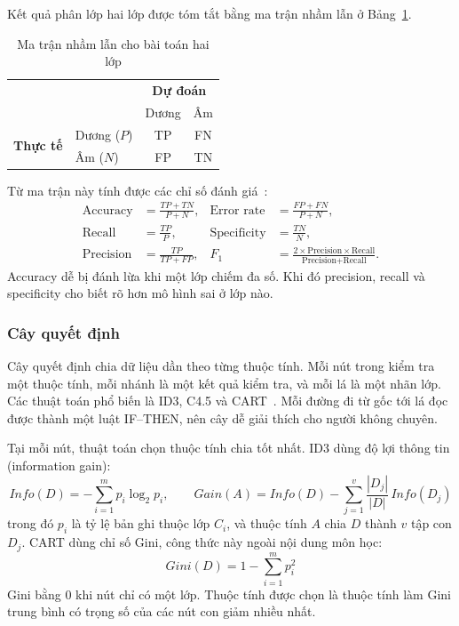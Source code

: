 Kết quả phân lớp hai lớp được tóm tắt bằng ma trận nhầm lẫn ở Bảng~\ref{tab:ma_tran_nham_lan}.

\begin{table}[!htbp]
\centering
\caption{Ma trận nhầm lẫn cho bài toán hai lớp}
\label{tab:ma_tran_nham_lan}
\begin{tabular}{llcc}
\toprule
 & & \multicolumn{2}{c}{\textbf{Dự đoán}} \\
 & & Dương & Âm \\
\midrule
\multirow{2}{*}{\textbf{Thực tế}} & Dương ($P$) & TP & FN \\
 & Âm ($N$) & FP & TN \\
\bottomrule
\end{tabular}
\end{table}

Từ ma trận này tính được các chỉ số đánh giá~\cite{han2011}:
\begin{align}
    \text{Accuracy} &= \frac{TP + TN}{P + N}, &
    \text{Error rate} &= \frac{FP + FN}{P + N}, \\
    \text{Recall} &= \frac{TP}{P}, &
    \text{Specificity} &= \frac{TN}{N}, \\
    \text{Precision} &= \frac{TP}{TP + FP}, &
    F_1 &= \frac{2 \times \text{Precision} \times \text{Recall}}{\text{Precision} + \text{Recall}}.
\end{align}
Accuracy dễ bị đánh lừa khi một lớp chiếm đa số. Khi đó precision, recall và specificity cho biết rõ hơn mô hình sai ở lớp nào.

\subsubsection{Cây quyết định}
Cây quyết định chia dữ liệu dần theo từng thuộc tính. Mỗi nút trong kiểm tra một thuộc tính, mỗi nhánh là một kết quả kiểm tra, và mỗi lá là một nhãn lớp. Các thuật toán phổ biến là ID3, C4.5 và CART~\cite{han2011}. Mỗi đường đi từ gốc tới lá đọc được thành một luật IF--THEN, nên cây dễ giải thích cho người không chuyên.

Tại mỗi nút, thuật toán chọn thuộc tính chia tốt nhất. ID3 dùng độ lợi thông tin (information gain):
\begin{equation}
    Info(D) = -\sum_{i=1}^{m} p_i \log_2 p_i, \qquad
    Gain(A) = Info(D) - \sum_{j=1}^{v} \frac{|D_j|}{|D|}\, Info(D_j)
\end{equation}
trong đó $p_i$ là tỷ lệ bản ghi thuộc lớp $C_i$, và thuộc tính $A$ chia $D$ thành $v$ tập con $D_j$. CART dùng chỉ số Gini, công thức này ngoài nội dung môn học:
\begin{equation}
    Gini(D) = 1 - \sum_{i=1}^{m} p_i^2
\end{equation}
Gini bằng 0 khi nút chỉ có một lớp. Thuộc tính được chọn là thuộc tính làm Gini trung bình có trọng số của các nút con giảm nhiều nhất.

